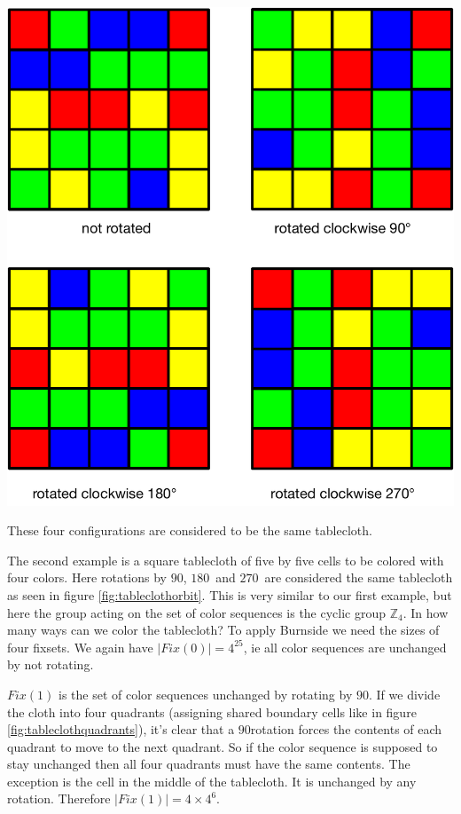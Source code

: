 \begin{marginfigure}[0.5in]
\includegraphics[scale=0.3]{tableclothorbit}
\caption{These four configurations are considered to be the same tablecloth.}
\label{fig:tableclothorbit}
\end{marginfigure}


The second example is a square tablecloth of five by five cells to be colored with four colors. Here rotations by $90$\textdegree, $180$\textdegree\ and $270$\textdegree\ are considered the same tablecloth as seen in figure \ref{fig:tableclothorbit}. This is very similar to our first example, but here the group acting on the set of color sequences is the cyclic group $\mathbb{Z}_4$. In how many ways can we color the tablecloth? To apply Burnside we need the sizes of four fixsets. We again have $|Fix(0)| = 4^{25}$, ie all color sequences are unchanged by not rotating. 

$Fix(1)$ is the set of color sequences unchanged by rotating by $90$\textdegree. If we divide the cloth into four quadrants (assigning shared boundary cells like in figure \ref{fig:tableclothquadrants}), it's clear that a $90$\textdegree rotation forces the contents of each quadrant to move to the next quadrant. So if the color sequence is supposed to stay unchanged then all four quadrants must have the same contents. The exception is the cell in the middle of the tablecloth. It is unchanged by any rotation. Therefore $|Fix(1)| = 4 \times 4^{6}$.

